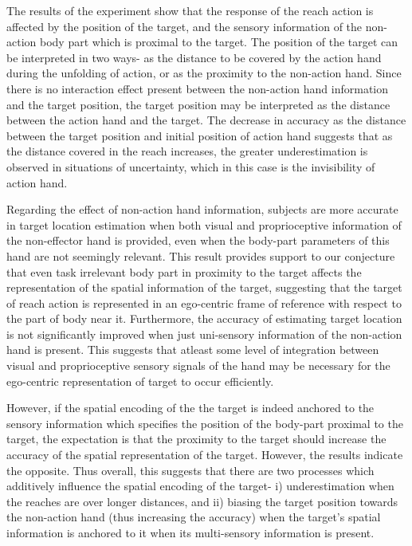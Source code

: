 The results of the experiment show that the response of the reach action is affected by the position of the target, and the sensory information of the non-action body part which is proximal to the target. The position of the target can be interpreted in two ways- as the distance to be covered by the action hand during the unfolding of action, or as the proximity to the non-action hand. Since there is no interaction effect present between the non-action hand information and the target position, the target position may be interpreted as the distance between the action hand and the target. The decrease in accuracy as the distance between the target position and initial position of action hand suggests that as the distance covered in the reach increases, the greater underestimation is observed in situations of uncertainty, which in this case is the invisibility of action hand.

Regarding the effect of non-action hand information, subjects are more accurate in target location estimation when both visual and proprioceptive information of the non-effector hand is provided, even when the body-part parameters of this hand are not seemingly relevant. This result provides support to our conjecture that even task irrelevant body part in proximity to the target affects the representation of the spatial information of the target, suggesting that the target of reach action is represented in an ego-centric frame of reference with respect to the part of body near it. Furthermore, the accuracy of estimating target location is not significantly improved when just uni-sensory information of the non-action hand is present. This suggests that atleast some level of integration between visual and proprioceptive sensory signals of the hand may be necessary for the ego-centric representation of target to occur efficiently.

However, if the spatial encoding of the the target is indeed anchored to the sensory information which specifies the position of the body-part proximal to the target, the expectation is that the proximity to the target should increase the accuracy of the spatial representation of the target. However, the results indicate the opposite. Thus overall, this suggests that there are two processes which additively influence the spatial encoding of the target- i) underestimation when the reaches are over longer distances, and ii) biasing the target position towards the non-action hand (thus increasing the accuracy) when the target's spatial information is anchored to it when its multi-sensory information is present.



